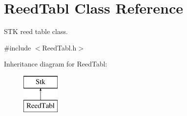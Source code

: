 \hypertarget{class_reed_tabl}{}\section{Reed\+Tabl Class Reference}
\label{class_reed_tabl}


S\+TK reed table class.  




{\ttfamily \#include $<$Reed\+Tabl.\+h$>$}

Inheritance diagram for Reed\+Tabl\+:\begin{figure}[H]
\begin{center}
\leavevmode
\includegraphics[height=2.000000cm]{class_reed_tabl}
\end{center}
\end{figure}
